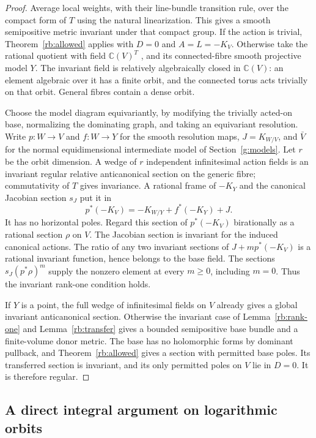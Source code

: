 \begin{proof}
Average local weights, with their line-bundle transition rule, over the
compact form of $T$ using the natural linearization.  This gives a
smooth semipositive metric invariant under that compact group.
If the action is trivial, Theorem~\ref{rb:allowed} applies with
$D=0$ and $A=L=-K_V$.  Otherwise take the rational quotient with field
$\mathbb C(V)^T$ \cite{Rosenlicht1956,BellGhiocaReichstein2017}, and its connected-fibre smooth
projective model $Y$.  The invariant field is relatively algebraically
closed in $\mathbb C(V)$: an element algebraic over it has a finite
orbit, and the connected torus acts trivially on that orbit.  General
fibres contain a dense orbit.

Choose the model diagram equivariantly, by modifying the trivially
acted-on base, normalizing the dominating graph, and taking an
equivariant resolution.  Write $p:W\to V$ and $f:W\to Y$ for the smooth resolution maps,
$J=K_{W/V}$, and $\bar V$ for the normal equidimensional intermediate
model of Section~\ref{g:models}. Let $r$ be the orbit dimension.  A wedge of
$r$ independent infinitesimal action fields is an invariant regular
relative anticanonical section on the generic fibre; commutativity of
$T$ gives invariance.  A rational frame of $-K_Y$ and the canonical
Jacobian section $s_J$ put it in
\[
 p^*(-K_V)=-K_{W/Y}+f^*(-K_Y)+J.
\]
It has no horizontal poles. Regard this section of $p^*(-K_V)$
birationally as a rational section $\rho$ on $V$.  The Jacobian section
is invariant for the induced canonical actions.  The ratio of any two
invariant sections of $J+mp^*(-K_V)$ is a rational invariant function,
hence belongs to the base field.  The sections $s_J(p^*\rho)^m$ supply the
nonzero element at every $m\geq0$, including $m=0$.  Thus the invariant
rank-one condition holds.

If $Y$ is a point, the full wedge of infinitesimal fields on $V$ already
gives a global invariant anticanonical section.  Otherwise the invariant
case of Lemma~\ref{rb:rank-one} and Lemma~\ref{rb:transfer} gives a
bounded semipositive base bundle and a finite-volume donor metric.
The base has no holomorphic forms by dominant pullback, and
Theorem~\ref{rb:allowed} gives a section with permitted base poles.
Its transferred section is invariant, and its only permitted poles on
$V$ lie in $D=0$.  It is therefore regular.
\end{proof}

\subsection{A direct integral argument on logarithmic orbits}

